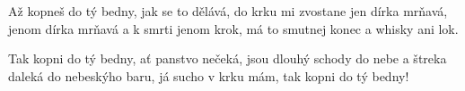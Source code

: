 \beginverse{}
\chordsoff{}
Až kopneš do tý bedny, jak se to dělává,
do krku mi zvostane jen dírka mrňavá,
jenom dírka mrňavá a k smrti jenom krok,
má to smutnej konec a whisky ani lok. 
\chordson{}
\endverse{}

\beginchorus{}
\chordsoff{}
Tak kopni do tý bedny, ať panstvo nečeká,
jsou dlouhý schody do nebe a štreka daleká
do nebeskýho baru, já sucho v krku mám,
tak kopni do tý bedny!
\chordson{}
\endchorus{}

\endsong{}
